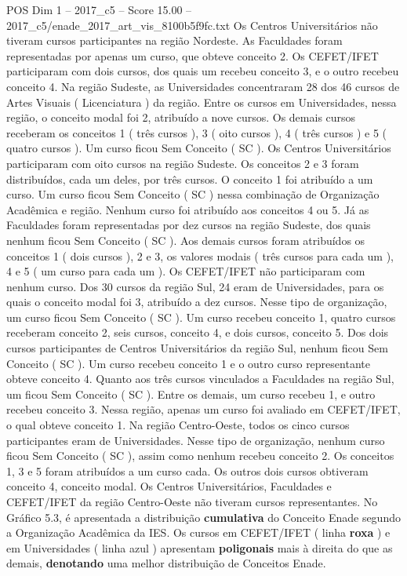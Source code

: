 \begin{textsample}{POS Dim 1 – 2017\_c5 – Score 15.00 – 2017\_c5/enade\_2017\_art\_vis\_8100b5f9fc.txt}
Os Centros Universitários não tiveram cursos participantes na região Nordeste.
As Faculdades foram representadas por apenas um curso, que obteve conceito 2.
Os CEFET/IFET participaram com dois cursos, dos quais um recebeu conceito 3, e o outro recebeu conceito 4.
Na região Sudeste, as Universidades concentraram 28 dos 46 cursos de Artes Visuais ( Licenciatura ) da região.
Entre os cursos em Universidades, nessa região, o conceito modal foi 2, atribuído a nove cursos.
Os demais cursos receberam os conceitos 1 ( três cursos ), 3 ( oito cursos ), 4 ( três cursos ) e 5 ( quatro cursos ).
Um curso ficou Sem Conceito ( SC ).
Os Centros Universitários participaram com oito cursos na região Sudeste.
Os conceitos 2 e 3 foram distribuídos, cada um deles, por três cursos.
O conceito 1 foi atribuído a um curso.
Um curso ficou Sem Conceito ( SC ) nessa combinação de Organização Acadêmica e região.
Nenhum curso foi atribuído aos conceitos 4 ou 5.
Já as Faculdades foram representadas por dez cursos na região Sudeste, dos quais nenhum ficou Sem Conceito ( SC ).
Aos demais cursos foram atribuídos os conceitos 1 ( dois cursos ), 2 e 3, os valores modais ( três cursos para cada um ), 4 e 5 ( um curso para cada um ).
Os CEFET/IFET não participaram com nenhum curso.
Dos 30 cursos da região Sul, 24 eram de Universidades, para os quais o conceito modal foi 3, atribuído a dez cursos.
Nesse tipo de organização, um curso ficou Sem Conceito ( SC ).
Um curso recebeu conceito 1, quatro cursos receberam conceito 2, seis cursos, conceito 4, e dois cursos, conceito 5.
Dos dois cursos participantes de Centros Universitários da região Sul, nenhum ficou Sem Conceito ( SC ).
Um curso recebeu conceito 1 e o outro curso representante obteve conceito 4.
Quanto aos três cursos vinculados a Faculdades na região Sul, um ficou Sem Conceito ( SC ).
Entre os demais, um curso recebeu 1, e outro recebeu conceito 3.
Nessa região, apenas um curso foi avaliado em CEFET/IFET, o qual obteve conceito 1.
Na região Centro-Oeste, todos os cinco cursos participantes eram de Universidades.
Nesse tipo de organização, nenhum curso ficou Sem Conceito ( SC ), assim como nenhum recebeu conceito 2.
Os conceitos 1, 3 e 5 foram atribuídos a um curso cada.
Os outros dois cursos obtiveram conceito 4, conceito modal.
Os Centros Universitários, Faculdades e CEFET/IFET da região Centro-Oeste não tiveram cursos representantes.
No Gráfico 5.3, é apresentada a distribuição \textbf{cumulativa} do Conceito Enade segundo a Organização Acadêmica da IES.
Os cursos em CEFET/IFET ( linha \textbf{roxa} ) e em Universidades ( linha azul ) apresentam \textbf{poligonais} mais à direita do que as demais, \textbf{denotando} uma melhor distribuição de Conceitos Enade.

\end{textsample}
